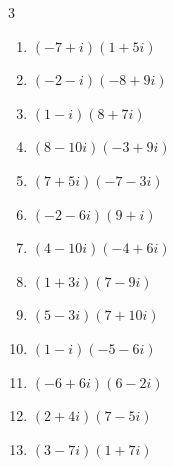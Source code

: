 \begin{multicols}{3}
\begin{enumerate}
  \item $\displaystyle (-7+i)(1+5i)$

        \phantom{$\displaystyle =-12-34i$}

  \item $\displaystyle (-2-i)(-8+9i)$

        \phantom{$\displaystyle =25-10i$}

  \item $\displaystyle (1-i)(8+7i)$

        \phantom{$\displaystyle =15-i$}

  \item $\displaystyle (8-10i)(-3+9i)$

        \phantom{$\displaystyle =66+102i$}

  \item $\displaystyle (7+5i)(-7-3i)$

        \phantom{$\displaystyle =-34-56i$}

  \item $\displaystyle (-2-6i)(9+i)$

        \phantom{$\displaystyle =-12-56i$}

\columnbreak %

  \item $\displaystyle (4-10i)(-4+6i)$

        \phantom{$\displaystyle =44+64i$}

  \item $\displaystyle (1+3i)(7-9i)$

        \phantom{$\displaystyle =34+12i$}

  \item $\displaystyle (5-3i)(7+10i)$

        \phantom{$\displaystyle =65+29i$}

  \item $\displaystyle (1-i)(-5-6i)$

        \phantom{$\displaystyle =-11-i$}

  \item $\displaystyle (-6+6i)(6-2i)$

        \phantom{$\displaystyle =-24+48i$}

  \item $\displaystyle (2+4i)(7-5i)$

        \phantom{$\displaystyle =34+18i$}

  \item $\displaystyle (3-7i)(1+7i)$

        \phantom{$\displaystyle =52+14i$}


\end{enumerate}
\end{multicols}
